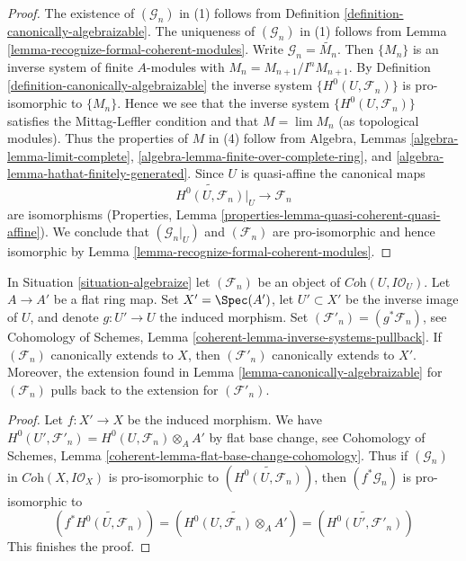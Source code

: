 \begin{proof}
The existence of $(\mathcal{G}_n)$ in (1) follows from
Definition \ref{definition-canonically-algebraizable}.
The uniqueness of $(\mathcal{G}_n)$ in (1) follows from
Lemma \ref{lemma-recognize-formal-coherent-modules}.
Write $\mathcal{G}_n = \widetilde{M_n}$.
Then $\{M_n\}$ is an inverse system of finite $A$-modules
with $M_n = M_{n + 1}/I^n M_{n + 1}$.
By Definition \ref{definition-canonically-algebraizable}
the inverse system $\{H^0(U, \mathcal{F}_n)\}$
is pro-isomorphic to $\{M_n\}$.
Hence we see that the inverse system $\{H^0(U, \mathcal{F}_n)\}$
satisfies the Mittag-Leffler condition and that
$M = \lim M_n$ (as topological modules).
Thus the properties of $M$ in (4) follow from
Algebra, Lemmas \ref{algebra-lemma-limit-complete},
\ref{algebra-lemma-finite-over-complete-ring}, and
\ref{algebra-lemma-hathat-finitely-generated}.
Since $U$ is quasi-affine the canonical maps
$$
\widetilde{H^0(U, \mathcal{F}_n)}|_U \to \mathcal{F}_n
$$
are isomorphisms (Properties, Lemma
\ref{properties-lemma-quasi-coherent-quasi-affine}).
We conclude that $(\mathcal{G}_n|_U)$ and $(\mathcal{F}_n)$ are
pro-isomorphic and hence isomorphic by
Lemma \ref{lemma-recognize-formal-coherent-modules}.
\end{proof}

\begin{lemma}
\label{lemma-canonically-extend-base-change}
In Situation \ref{situation-algebraize} let $(\mathcal{F}_n)$ be an
object of $\textit{Coh}(U, I\mathcal{O}_U)$. Let $A \to A'$ be a flat ring
map. Set $X' = \Spec(A')$, let $U' \subset X'$ be the inverse image of $U$,
and denote $g : U' \to U$ the induced morphism. Set
$(\mathcal{F}'_n) = (g^*\mathcal{F}_n)$, see
Cohomology of Schemes, Lemma \ref{coherent-lemma-inverse-systems-pullback}.
If $(\mathcal{F}_n)$ canonically extends to $X$, then
$(\mathcal{F}'_n)$ canonically extends to $X'$.
Moreover, the extension found in Lemma \ref{lemma-canonically-algebraizable}
for $(\mathcal{F}_n)$ pulls back to the extension for
$(\mathcal{F}'_n)$.
\end{lemma}

\begin{proof}
Let $f : X' \to X$ be the induced morphism.
We have $H^0(U', \mathcal{F}'_n) = H^0(U, \mathcal{F}_n) \otimes_A A'$ by
flat base change, see Cohomology of Schemes, Lemma
\ref{coherent-lemma-flat-base-change-cohomology}.
Thus if $(\mathcal{G}_n)$ in $\textit{Coh}(X, I\mathcal{O}_X)$
is pro-isomorphic to $(\widetilde{H^0(U, \mathcal{F}_n)})$, then
$(f^*\mathcal{G}_n)$ is pro-isomorphic to
$$
(f^*\widetilde{H^0(U, \mathcal{F}_n)}) =
(\widetilde{H^0(U, \mathcal{F}_n) \otimes_A A'}) =
(\widetilde{H^0(U', \mathcal{F}'_n)})
$$
This finishes the proof.
\end{proof}

